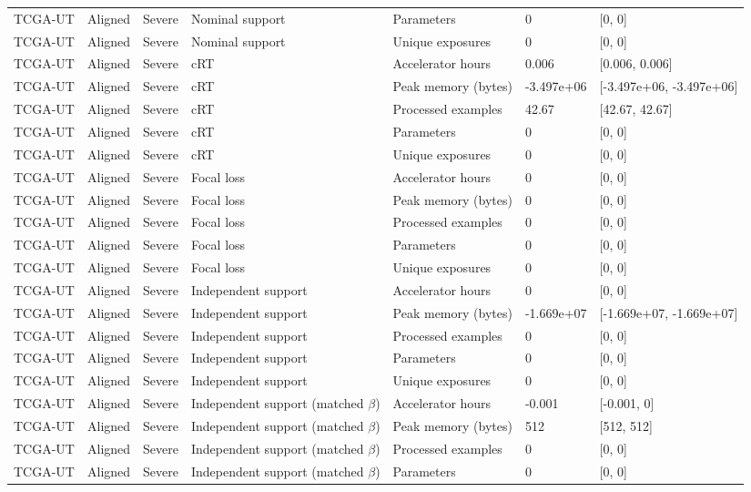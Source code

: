 \begin{longtable}{lllllll}
TCGA-UT & Aligned & Severe & Nominal support & Parameters & 0 & [0, 0] \\
TCGA-UT & Aligned & Severe & Nominal support & Unique exposures & 0 & [0, 0] \\
TCGA-UT & Aligned & Severe & cRT & Accelerator hours & 0.006 & [0.006, 0.006] \\
TCGA-UT & Aligned & Severe & cRT & Peak memory (bytes) & -3.497e+06 & [-3.497e+06, -3.497e+06] \\
TCGA-UT & Aligned & Severe & cRT & Processed examples & 42.67 & [42.67, 42.67] \\
TCGA-UT & Aligned & Severe & cRT & Parameters & 0 & [0, 0] \\
TCGA-UT & Aligned & Severe & cRT & Unique exposures & 0 & [0, 0] \\
TCGA-UT & Aligned & Severe & Focal loss & Accelerator hours & 0 & [0, 0] \\
TCGA-UT & Aligned & Severe & Focal loss & Peak memory (bytes) & 0 & [0, 0] \\
TCGA-UT & Aligned & Severe & Focal loss & Processed examples & 0 & [0, 0] \\
TCGA-UT & Aligned & Severe & Focal loss & Parameters & 0 & [0, 0] \\
TCGA-UT & Aligned & Severe & Focal loss & Unique exposures & 0 & [0, 0] \\
TCGA-UT & Aligned & Severe & Independent support & Accelerator hours & 0 & [0, 0] \\
TCGA-UT & Aligned & Severe & Independent support & Peak memory (bytes) & -1.669e+07 & [-1.669e+07, -1.669e+07] \\
TCGA-UT & Aligned & Severe & Independent support & Processed examples & 0 & [0, 0] \\
TCGA-UT & Aligned & Severe & Independent support & Parameters & 0 & [0, 0] \\
TCGA-UT & Aligned & Severe & Independent support & Unique exposures & 0 & [0, 0] \\
TCGA-UT & Aligned & Severe & Independent support (matched $\beta$) & Accelerator hours & -0.001 & [-0.001, 0] \\
TCGA-UT & Aligned & Severe & Independent support (matched $\beta$) & Peak memory (bytes) & 512 & [512, 512] \\
TCGA-UT & Aligned & Severe & Independent support (matched $\beta$) & Processed examples & 0 & [0, 0] \\
TCGA-UT & Aligned & Severe & Independent support (matched $\beta$) & Parameters & 0 & [0, 0] \\

\end{longtable}
